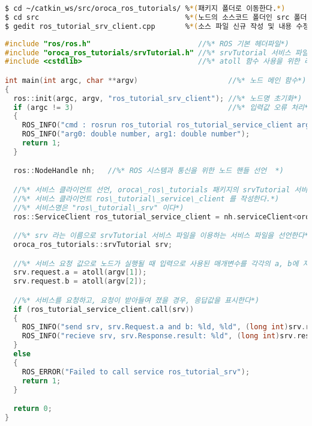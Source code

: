 \begin{lstlisting}[language=bash]
$ cd ~/catkin_ws/src/oroca_ros_tutorials/ %*(패키지 폴더로 이동한다.*)
$ cd src                                  %*(노드의 소스코드 폴더인 src 폴더로 이동*)
$ gedit ros_tutorial_srv_client.cpp       %*(소스 파일 신규 작성 및 내용 수정*)
\end{lstlisting}

\begin{lstlisting}[language=C++]
#include "ros/ros.h"                         //%* ROS 기본 헤더파일*)
#include "oroca_ros_tutorials/srvTutorial.h" //%* srvTutorial 서비스 파일 헤더*)
#include <cstdlib>                           //%* atoll 함수 사용을 위한 라이브러리*)

int main(int argc, char **argv)                     //%* 노드 메인 함수*)
{
  ros::init(argc, argv, "ros_tutorial_srv_client"); //%* 노드명 초기화*)
  if (argc != 3)                                    //%* 입력값 오류 처리*)
  {
    ROS_INFO("cmd : rosrun ros_tutorial ros_tutorial_service_client arg0 arg1");
    ROS_INFO("arg0: double number, arg1: double number");
    return 1;
  }

  ros::NodeHandle nh;   //%* ROS 시스템과 통신을 위한 노드 핸들 선언  *)

  //%* 서비스 클라이언트 선언, oroca\_ros\_tutorials 패키지의 srvTutorial 서비스 파일을 이용한*)
  //%* 서비스 클라이언트 ros\_tutorial\_service\_client 를 작성한다.*)
  //%* 서비스명은 "ros\_tutorial\_srv" 이다*)
  ros::ServiceClient ros_tutorial_service_client = nh.serviceClient<oroca_ros_tutorials::srvTutorial>("ros_tutorial_srv");

  //%* srv 라는 이름으로 srvTutorial 서비스 파일을 이용하는 서비스 파일을 선언한다*)
  oroca_ros_tutorials::srvTutorial srv;

  //%* 서비스 요청 값으로 노드가 실행될 때 입력으로 사용된 매개변수를 각각의 a, b에 저장한다*)
  srv.request.a = atoll(argv[1]);
  srv.request.b = atoll(argv[2]);

  //%* 서비스를 요청하고, 요청이 받아들여 졌을 경우, 응답값을 표시한다*)
  if (ros_tutorial_service_client.call(srv))
  {
    ROS_INFO("send srv, srv.Request.a and b: %ld, %ld", (long int)srv.request.a, (long int)srv.request.b);
    ROS_INFO("recieve srv, srv.Response.result: %ld", (long int)srv.response.result);
  }
  else
  {
    ROS_ERROR("Failed to call service ros_tutorial_srv");
    return 1;
  }

  return 0;
}
\end{lstlisting}


